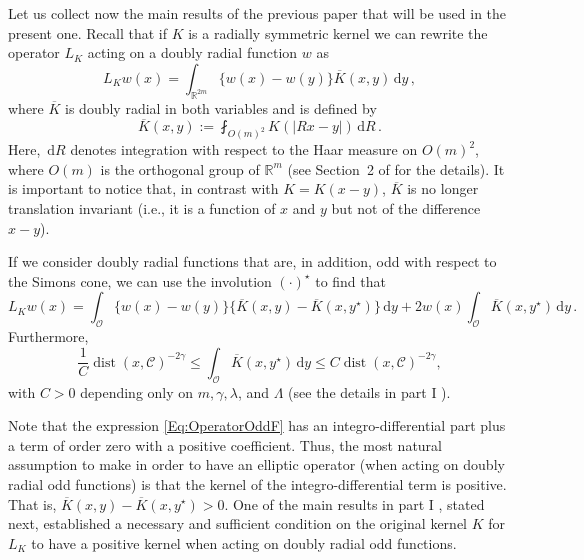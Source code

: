 \documentclass[12pt,reqno]{amsart}
\theoremstyle{definition}
\theoremstyle{remark}
\newcommand{\con}[1]{\mathbb{#1}}
\newcommand{\R}{\con{R}} %
\newcommand{\ccal}{\mathscr{C}}
\newcommand{\ocal}{\mathcal{O}}
\newcommand{\s}{\gamma}
\renewcommand{\d}{\,\mathrm{d}} %
\newcommand{\average}{\fint}
\DeclareMathOperator{\dist}{dist}
\numberwithin{equation}{section}
\begin{document}
Let us collect now the main results of the previous paper \cite{FelipeSanz-Perela:IntegroDifferentialI} that will be used in the present one. Recall that if $K$ is a radially symmetric kernel we can rewrite the operator $L_K$ acting on a doubly radial function $w$ as
$$
L_K w(x) = \int_{\R^{2m}} \{w(x) - w(y)\} \overline{K}(x,y) \d y\,,
$$
where $\overline{K}$ is doubly radial in both variables and is defined by
\begin{equation}
\label{Eq:KbarDef}
\overline{K}(x,y) := \average_{O(m)^2} K(|Rx - y|)\d R\,.
\end{equation}
Here, $\d R$ denotes integration with respect to the Haar measure on $O(m)^2$, where $O(m)$ is the orthogonal group of $\R^m$ (see Section~2 of \cite{FelipeSanz-Perela:IntegroDifferentialI} for the details). It is important to notice that, in contrast with $K=K(x-y)$, $\overline{K}$ is no longer translation invariant (i.e., it is a function of $x$ and $y$ but not of the difference $x-y$).

If we consider doubly radial functions that are, in addition, odd with respect to the Simons cone, we can use the involution $(\cdot)^\star$ to find that
\begin{equation}
\label{Eq:OperatorOddF}
L_K w (x) = \int_{\ocal} \{w(x) - w(y) \} \{\overline{K}(x, y) - \overline{K}(x, y^\star)  \} \d y +  2 w(x) \int_{\ocal} \overline{K}(x, y^\star) \d y \,.
\end{equation}
Furthermore,
\begin{equation}
\label{Eq:ZeroOrderTerm}
\frac{1}{C} \dist(x,\ccal)^{-2\s} \leq \int_{\ocal} \overline{K}(x, y^\star) \d y \leq C \dist(x,\ccal)^{-2\s},
\end{equation}
with $C>0$ depending only on $m, \s, \lambda$, and $\Lambda$ (see the details in part I \cite{FelipeSanz-Perela:IntegroDifferentialI}).


Note that the expression \eqref{Eq:OperatorOddF} has an integro-differential part plus a term of order zero with a positive coefficient. Thus, the most natural assumption to make in order to have an elliptic operator (when acting on doubly radial odd functions) is that the kernel of the integro-differential term is positive. That is, $\overline{K}(x, y) - \overline{K}(x, y^\star)>0$. One of the main results in part I \cite{FelipeSanz-Perela:IntegroDifferentialI}, stated next, established a necessary and sufficient condition on the original kernel $K$ for $L_K$ to have a positive kernel when acting on doubly radial odd functions. 
\end{document}
